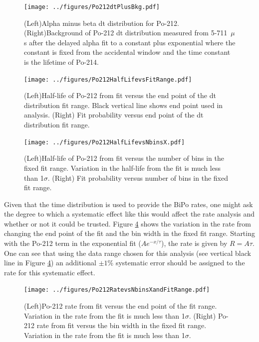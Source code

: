 \begin{figure}[!ht]
	\centering
	\texttt{[image: ../figures/Po212dtPlusBkg.pdf]}
	\caption{\label{fig:Po212dtplusbkg}(Left)Alpha minus beta dt distribution for Po-212. (Right)Background of Po-212 dt distribution measured from 5-711~$\mu$s after the delayed alpha fit to a constant plus exponential where the constant is fixed from the accidental window and the time constant is the lifetime of Po-214.}
\end{figure}
\begin{figure}[!h]
	\centering
	\texttt{[image: ../figures/Po212HalfLifevsFitRange.pdf]}
	\caption{\label{fig:Po212halflifevsfitrange} (Left)Half-life of Po-212 from fit versus the end point of the dt distribution fit range. Black vertical line shows end point used in analysis. (Right) Fit probability versus end point of the dt distribution fit range.}
\end{figure}
\begin{figure}[t]
\centering
	\texttt{[image: ../figures/Po212HalfLifevsNbinsX.pdf]}
	\caption{\label{fig:Po212halflifevsNbinsX}(Left)Half-life of Po-212 from fit versus the number of bins in the fixed fit range. Variation in the half-life from the fit is much less than 1$\sigma$.  (Right) Fit probability versus number of bins in the fixed fit range.}
\end{figure}

Given that the time distribution is used to provide the BiPo rates, one might ask the degree to which a systematic effect like this would affect the rate analysis and whether or not it could be trusted. Figure \ref{fig:Po212RatevsNbinsXandFitRange} shows the variation in the rate from changing the end point of the fit and the bin width in the fixed fit range. Starting with the Po-212 term in the exponential fit ($Ae^{-x/\tau}$), the rate is given by $R=A\tau$. One can see that using the data range chosen for this analysis (see vertical black line in Figure \ref{fig:Po212RatevsNbinsXandFitRange}) an additional $\pm1$\% systematic error should be assigned to the rate for this systematic effect. 
 \begin{figure}[t]
 	\centering
 	\texttt{[image: ../figures/Po212RatevsNbinsXandFitRange.pdf]}
 	\caption{\label{fig:Po212RatevsNbinsXandFitRange}(Left)Po-212 rate from fit versus the end point of the fit range. Variation in the rate from the fit is much less than 1$\sigma$.  (Right) Po-212 rate from fit versus the bin width in the fixed fit range. Variation in the rate from the fit is much less than 1$\sigma$.}
 \end{figure}

